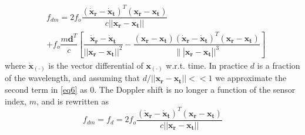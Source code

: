 \documentclass[11pt,draftclsnofoot,onecolumn]{IEEEtran}
\theoremstyle{definition}
\theoremstyle{remark}
\begin{document}
\begin{align} \label{eq6}
&f_{dm}=2f_o\dfrac{(\mathbf{\dot{x}_r}-\mathbf{\dot{x}_t})^T(\mathbf{x_r}-\mathbf{x_t})}{c||\mathbf{x_r}-\mathbf{x_t}||}  \\
&+ f_o\dfrac{m\mathbf{d}^T}{c}\left[\dfrac{\mathbf{\dot{x}_r}-\mathbf{\dot{x}_t}}{||\mathbf{x_r}-\mathbf{x_t}||^2} -\dfrac{(\mathbf{x_r}-\mathbf{x_t})(\mathbf{\dot{x}_r}-\mathbf{\dot{x}_t})^T(\mathbf{x_r}-\mathbf{x_t})}{\|| \mathbf{x_r}-\mathbf{x_t}||^3} \right] \nonumber
\end{align}
where $\mathbf{\dot{x}_{(\cdot)}}$ is the vector differential of $\mathbf{x_{(\cdot)}}$ w.r.t. time. In practice $d$ is a fraction of the wavelength, and assuming that $d/|| \mathbf{x_r}-\mathbf{x_t}||<<1$ we approximate the second term in \eqref{eq6} as $0$. The Doppler shift is no longer a function of the sensor index, $m$, and is rewritten as
\begin{equation} \label{eq7}
f_{dm}=f_d=2f_o\dfrac{(\mathbf{\dot{x}_r}-\mathbf{\dot{x}_t})^T(\mathbf{x_r}-\mathbf{x_t})}{c||\mathbf{x_r}-\mathbf{x_t}||}
\end{equation}
\end{document}
